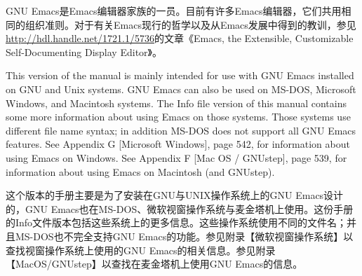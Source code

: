 GNU Emacs是Emacs编辑器家族的一员。目前有许多Emacs编辑器，它们共用相同的组织准则。对于有关Emacs现行的哲学以及从Emacs发展中得到的教训，参见\url{http://hdl.handle.net/1721.1/5736}的文章《Emacs, the Extensible, Customizable Self-Documenting Display Editor》。\par
This version of the manual is mainly intended for use with GNU Emacs installed on GNU and Unix systems. GNU Emacs can also be used on MS-DOS, Microsoft Windows, and Macintosh systems. The Info file version of this manual contains some more information about using Emacs on those systems. Those systems use different file name syntax; in addition MS-DOS does not support all GNU Emacs features. See Appendix G [Microsoft Windows], page 542, for information about using Emacs on Windows. See Appendix F [Mac OS / GNUstep], page 539, for information about using Emacs on Macintosh (and
GNUstep).\par
这个版本的手册主要是为了安装在GNU与UNIX操作系统上的GNU Emacs设计的，GNU Emacs也在MS-DOS、微软视窗操作系统与麦金塔机上使用。这份手册的Info文件版本包括这些系统上的更多信息。这些操作系统使用不同的文件名；并且MS-DOS也不完全支持GNU Emacs的功能。参见附录【微软视窗操作系统】以查找视窗操作系统上使用的GNU Emacs的相关信息。参见附录【MacOS/GNUstep】以查找在麦金塔机上使用GNU Emacs的信息。
